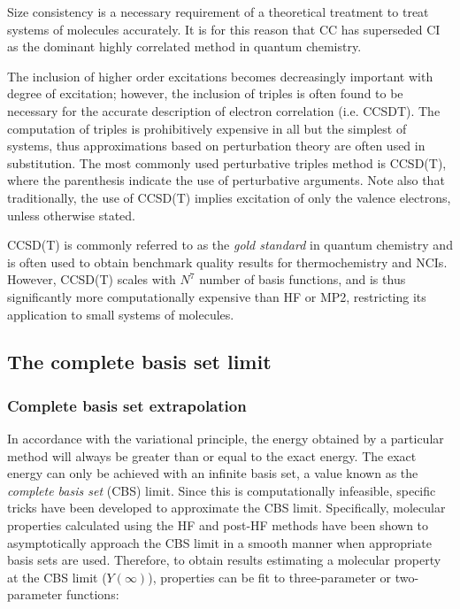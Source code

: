 \noindent Size consistency is a necessary requirement of a theoretical treatment to treat systems of molecules accurately. It is for this reason that CC has superseded CI as the dominant highly correlated method in quantum chemistry.

The inclusion of higher order excitations becomes decreasingly important with degree of excitation; however, the inclusion of triples is often found to be necessary for the accurate description of electron correlation (i.e. CCSDT). The computation of triples is prohibitively expensive in all but the simplest of systems, thus approximations based on perturbation theory are often used in substitution. The most commonly used perturbative triples method is CCSD(T), where the parenthesis indicate the use of perturbative arguments. Note also that traditionally, the use of CCSD(T) implies excitation of only the valence electrons, unless otherwise stated.

CCSD(T) is commonly referred to as the \emph{gold standard} in quantum chemistry and is often used to obtain benchmark quality results for thermochemistry and NCIs.\cite{Levine2013} However, CCSD(T) scales with $N^7$ number of basis functions, and is thus significantly more computationally expensive than HF or MP2, restricting its application to small systems of molecules.

\subsection{The complete basis set limit}

\subsubsection{Complete basis set extrapolation}

In accordance with the variational principle, the energy obtained by a particular method will always be greater than or equal to the exact energy. The exact energy can only be achieved with an infinite basis set, a value known as the \emph{complete basis set} (CBS) limit.\cite{Truhlar1998} Since this is computationally infeasible, specific tricks have been developed to approximate the CBS limit. Specifically, molecular properties calculated using the HF and post-HF methods have been shown to asymptotically approach the CBS limit in a smooth manner when appropriate basis sets are used. Therefore, to obtain results estimating a molecular property at the CBS limit ($Y(\infty)$), properties can be fit to three-parameter\cite{Feller1992,Feller1993} or two-parameter functions:\cite{Helgaker1997,Halkier1998}

